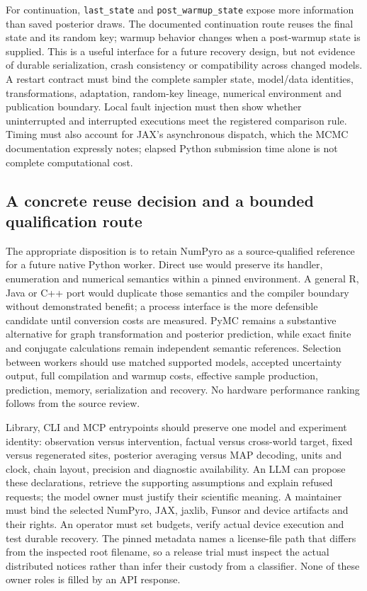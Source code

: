 For continuation, \texttt{last\_state} and \texttt{post\_warmup\_state} expose more information than saved posterior draws. The documented continuation route reuses the final state and its random key; warmup behavior changes when a post-warmup state is supplied. This is a useful interface for a future recovery design, but not evidence of durable serialization, crash consistency or compatibility across changed models. A restart contract must bind the complete sampler state, model/data identities, transformations, adaptation, random-key lineage, numerical environment and publication boundary. Local fault injection must then show whether uninterrupted and interrupted executions meet the registered comparison rule. Timing must also account for JAX's asynchronous dispatch, which the MCMC documentation expressly notes; elapsed Python submission time alone is not complete computational cost. \cite{exec23_numpyro_sources}

\subsection{A concrete reuse decision and a bounded qualification route}

The appropriate disposition is to retain NumPyro as a source-qualified reference for a future native Python worker. Direct use would preserve its handler, enumeration and numerical semantics within a pinned environment. A general R, Java or C++ port would duplicate those semantics and the compiler boundary without demonstrated benefit; a process interface is the more defensible candidate until conversion costs are measured. PyMC remains a substantive alternative for graph transformation and posterior prediction, while exact finite and conjugate calculations remain independent semantic references. Selection between workers should use matched supported models, accepted uncertainty output, full compilation and warmup costs, effective sample production, prediction, memory, serialization and recovery. No hardware performance ranking follows from the source review. \cite{exec23_numpyro_sources,exec23_pymc_sources,exec23_numpyro_reference}

Library, CLI and MCP entrypoints should preserve one model and experiment identity: observation versus intervention, factual versus cross-world target, fixed versus regenerated sites, posterior averaging versus MAP decoding, units and clock, chain layout, precision and diagnostic availability. An LLM can propose these declarations, retrieve the supporting assumptions and explain refused requests; the model owner must justify their scientific meaning. A maintainer must bind the selected NumPyro, JAX, jaxlib, Funsor and device artifacts and their rights. An operator must set budgets, verify actual device execution and test durable recovery. The pinned metadata names a license-file path that differs from the inspected root filename, so a release trial must inspect the actual distributed notices rather than infer their custody from a classifier. None of these owner roles is filled by an API response. \cite{exec23_numpyro_sources}

